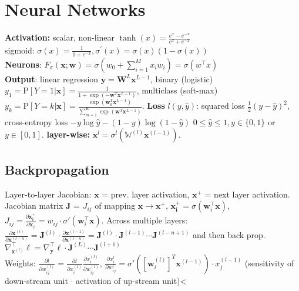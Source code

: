 \section{Neural Networks}
\textbf{Activation:} scalar, non-linear $\tanh(x)=\frac{e^x-e^{-x}}{e^x+e^{-x}}$\\ sigmoid: $\sigma(x)= \frac{1}{1+e^{-x}},\sigma^{'}(x)=\sigma(x)(1-\sigma(x))$\\
\textbf{Neurons}: $F_\sigma(\mathbf{x};\mathbf{w}) = \sigma(w_0 + \sum_{i=1}^M{x_iw_i}) = \sigma(w^{\top}x)$\\ \textbf{Output}: linear regression $\mathbf{y} = \mathbf{W}^L\mathbf{x}^{L-1}$, binary (logistic) $y_1 = \text{P}[Y=1|\mathbf{x}] = \frac{1}{1 + \exp(-\mathbf{w}^T \mathbf{x}^{L-1})}$, multiclass (soft-max) $y_k = \text{P}[Y=k|\mathbf{x}]= \frac{\exp( \mathbf{w}_k^T\mathbf{x}^{L-1})}{\sum_{m=1}^{K}{\exp(\mathbf{w}^T\mathbf{x}^{L-1})}}$.
\textbf{Loss} $l(y, \hat{y})$: squared loss $\frac{1}{2}(y - \hat{y})^2$, cross-entropy loss $-y \log \hat{y} - (1-y)\log(1-\hat{y})$ $0\leq\hat{y}\leq1, y \in \{0,1\}$ or $y \in [0,1]$. \textbf{layer-wise:} $\mathbf{x}^{l} = \sigma^{l}\left(\mathbb{W}^{\left(l\right)}\mathbf{x}^{\left(l-1\right)}\right)$.

\subsection*{Backpropagation}
Layer-to-layer Jacobian: $\mathbf{x}$ = prev. layer activation, $\mathbf{x^+}$ = next layer activation. Jacobian matrix $\mathbf{J}$ = $J_{ij}$ of mapping $\mathbf{x}\rightarrow\mathbf{x^+}$, $\mathbf{x_i^+} = \sigma(\mathbf{w}_i^\top\mathbf{x})$, $J_{ij} = \frac{\partial \mathbf{x_i^+}}{\partial \mathbf{x}_j} = w_{ij}\cdot\sigma'(\mathbf{w}_i^\top\mathbf{x})$. Across multiple layers: $\frac{\partial\mathbf{x}^{(l)}}{\partial\mathbf{x}^{(l-n)}} = \mathbf{J}^{(l)}\cdot\frac{\partial\mathbf{x}^{(l-1)}}{\partial\mathbf{x}^{(l-n)}}=\mathbf{J}^{(l)}\cdot\mathbf{J}^{(l-1)}\cdots\mathbf{J}^{(l-n+1)}$ and then back prop. $ \nabla_{\mathbf{x}^{(l)}}^\top\ell=\nabla_{\mathbf{y}}^\top\ell\cdot\mathbf{J}^{(L)}\cdots\mathbf{J}^{(l+1)}$\\
Weights: $\frac{\partial l}{\partial w_{ij}^{(l)}} = \frac{\partial l}{\partial x_i^{(l)}}\frac{\partial x_i^{(l)}}{\partial w_{ij}^{(l)}}$, $\frac{\partial x_i^{l}}{\partial w_{ij}^{l}} = \sigma'([\mathbf{w}_i^{(l)}]^T \mathbf{x}^{(l-1)})\cdot x_j^{(l-1)}$ (sensitivity of down-stream unit $\cdot$ activation of up-stream unit)<

